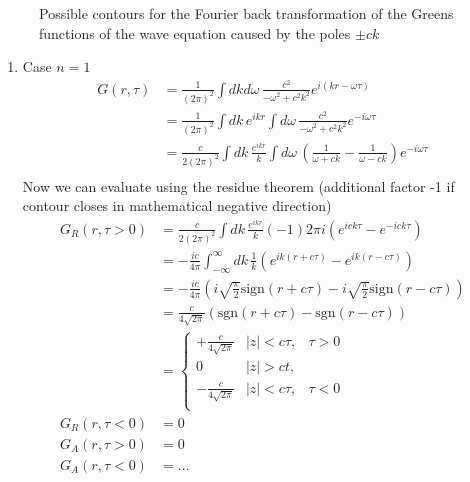 \documentclass[10pt,a4paper]{book}
\theoremstyle{definition}
\begin{document}
\begin{itemize}
\begin{figure}[!h]
\begin{center}
\end{center}

\caption{Possible contours for the Fourier back transformation of the Greens functions of the wave equation caused by the poles $\pm ck$}
\end{figure}

\begin{enumerate}
\item Case $n=1$
\begin{align}
G(r,\tau)
&=\frac{1}{(2\pi)^2}\int dkd\omega\,\frac{c^2}{-\omega^2+c^2k^2}e^{i(kr-\omega\tau)}\\
&=\frac{1}{(2\pi)^2}\int dk\,e^{ikr}\int d\omega\,\frac{c^2}{-\omega^2+c^2k^2}e^{-i\omega\tau}\\
&=\frac{c}{2(2\pi)^2}\int dk\,\frac{e^{ikr}}{k}\int d\omega\,\left(\frac{1}{\omega+ck}-\frac{1}{\omega-ck}\right)e^{-i\omega\tau}\\
\end{align}
Now we can evaluate using the residue theorem (additional factor -1 if contour closes in mathematical negative direction)
\begin{align}
G_R(r,\tau>0)
&=\frac{c}{2(2\pi)^2}\int dk\,\frac{e^{ikr}}{k}(-1)2\pi i\left(e^{ick\tau}-e^{-ick\tau}\right)\\
&=-\frac{ic}{4\pi}\int_{-\infty}^\infty dk\,\frac{1}{k}\left(e^{ik(r+c\tau)}-e^{ik(r-c\tau)}\right)\\
&=-\frac{ic}{4\pi}\left(i\sqrt{\frac{\pi}{2}}\text{sign}(r+c\tau)-i\sqrt{\frac{\pi}{2}}\text{sign}(r-c\tau)\right)\\
&=\frac{c}{4\sqrt{2\pi}}\left(\text{sgn}(r+c\tau)-\text{sgn}(r-c\tau)\right)\\
&=\left\{\begin{matrix}
+\frac{c}{4\sqrt{2\pi}}&|z|<c\tau,& \tau>0\\
0& |z|>ct,&\\
-\frac{c}{4\sqrt{2\pi}}&|z|<c\tau,& \tau<0\\
\end{matrix}\right.\\
G_R(r,\tau<0)&=0\\
G_A(r,\tau>0)&=0\\
G_A(r,\tau<0)&=...
\end{align}


\end{enumerate}
\end{itemize}
\end{document}
